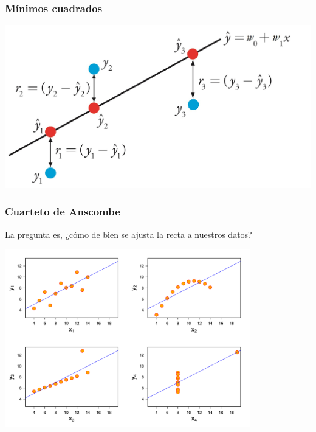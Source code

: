 \documentclass{beamer}
\begin{document}
\begin{frame}
\frametitle{Mínimos cuadrados}

\centering
\includegraphics[width=\textwidth]{minimos_cuadrados.jpg}

\end{frame}



\begin{frame}
\frametitle{Cuarteto de Anscombe}

La pregunta es, ¿cómo de bien se ajusta la recta a nuestros datos?

\vfill
\centering
\hspace*{-1.5em}
\includegraphics[width=0.8\textwidth]{anscombe.pdf}
\end{frame}
\end{document}
